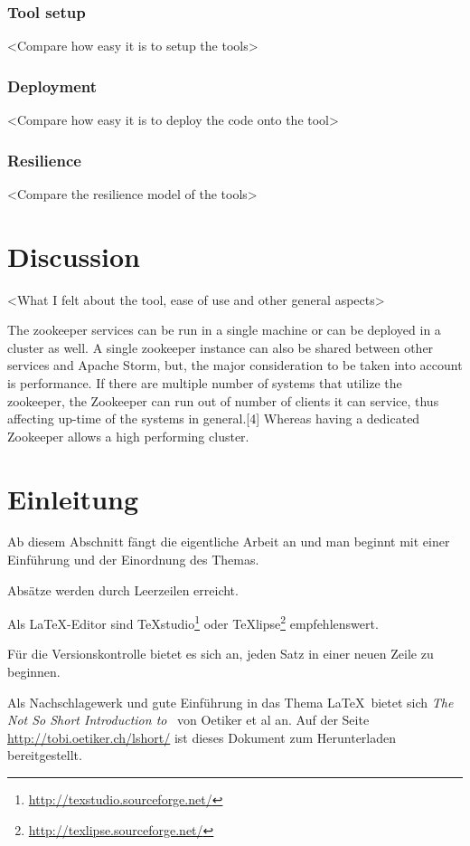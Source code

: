 \documentclass[runningheads,a4paper]{llncs}[2015/06/24]
\begin{document}
 \subsubsection{Tool setup}
 <Compare how easy it is to setup the tools>
 
 \subsubsection{Deployment}
 <Compare how easy it is to deploy the code onto the tool>
 
 \subsubsection{Resilience}
 <Compare the resilience model of the tools>
 
 \section{Discussion}
<What I felt about the tool, ease of use and other general aspects> 
 
 
 The zookeeper services can be run in a single machine or can be deployed in a cluster as well. A single zookeeper instance can also be shared between other services and Apache Storm, but, the major consideration to be taken into account is performance. If there are multiple number of systems that utilize the zookeeper, the Zookeeper can run out of number of clients it can service, thus affecting up-time of the systems in general.[4] Whereas having a dedicated Zookeeper allows a high performing cluster.

\section{Einleitung}
Ab diesem Abschnitt fängt die eigentliche Arbeit an und man beginnt mit einer Einführung und der Einordnung des Themas.

Absätze werden durch Leerzeilen erreicht.

Als \LaTeX-Editor sind TeXstudio\footnote{\url{http://texstudio.sourceforge.net/}} oder TeXlipse\footnote{\url{http://texlipse.sourceforge.net/}} empfehlenswert.

Für die Versionskontrolle bietet es sich an, jeden Satz in einer neuen Zeile zu beginnen.

Als Nachschlagewerk und gute Einführung in das Thema \LaTeX\ bietet sich \emph{The Not So Short Introduction to \LaTeXe}\ von Oetiker et al an.
Auf der Seite \url{http://tobi.oetiker.ch/lshort/} ist dieses Dokument zum Herunterladen bereitgestellt.
\end{document}
